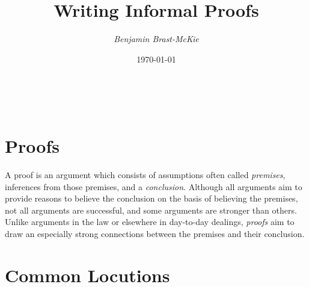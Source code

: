 \documentclass[a4paper, 11pt]{article} %
\title{\textbf{Writing Informal Proofs}} %
\author{\em Benjamin Brast-McKie} %
\date{\today\vspace{-0pt}} %
\makeatletter
\renewcommand{\maketitle}{ %
\begin{flushright} %
{\LARGE\@title} %

\vspace{10pt} %

{\@author} %
\\\@date %

\vspace{30pt} %
\end{flushright}
}
\makeatother
\begin{document}
\maketitle %

\thispagestyle{empty}



\section*{Proofs}

A proof is an argument which consists of assumptions often called \textit{premises}, inferences from those premises, and a \textit{conclusion}.
Although all arguments aim to provide reasons to believe the conclusion on the basis of believing the premises, not all arguments are successful, and some arguments are stronger than others.
Unlike arguments in the law or elsewhere in day-to-day dealings, \textit{proofs} aim to draw an especially strong connections between the premises and their conclusion.

\section*{Common Locutions}
\end{document}
